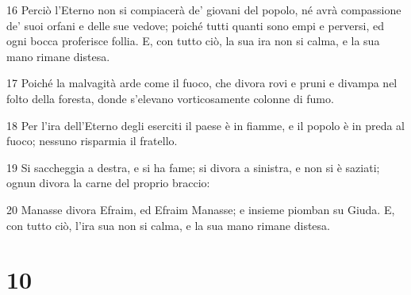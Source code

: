 \par 16 Perciò l'Eterno non si compiacerà de' giovani del popolo, né avrà compassione de' suoi orfani e delle sue vedove; poiché tutti quanti sono empi e perversi, ed ogni bocca proferisce follia. E, con tutto ciò, la sua ira non si calma, e la sua mano rimane distesa.
\par 17 Poiché la malvagità arde come il fuoco, che divora rovi e pruni e divampa nel folto della foresta, donde s'elevano vorticosamente colonne di fumo.
\par 18 Per l'ira dell'Eterno degli eserciti il paese è in fiamme, e il popolo è in preda al fuoco; nessuno risparmia il fratello.
\par 19 Si saccheggia a destra, e si ha fame; si divora a sinistra, e non si è saziati; ognun divora la carne del proprio braccio:
\par 20 Manasse divora Efraim, ed Efraim Manasse; e insieme piomban su Giuda. E, con tutto ciò, l'ira sua non si calma, e la sua mano rimane distesa.

\chapter{10}

